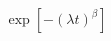 \documentclass[12pt]{article}
\begin{document}
\begin{displaymath}
\exp\left[-(\lambda t)^\beta\right]
\end{displaymath}
\end{document}
